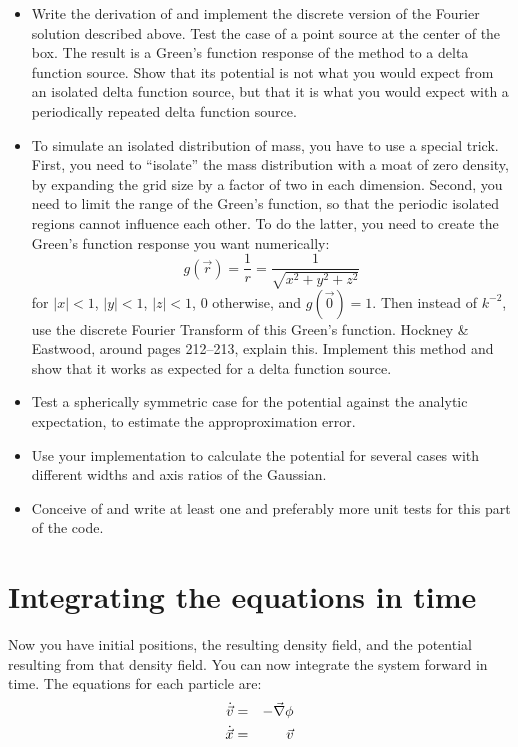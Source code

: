 \documentclass[11pt, preprint]{aastex}
\begin{document}
\begin{itemize}
\item Write the derivation of and implement the discrete version of
  the Fourier solution described above. Test the case of a point
  source at the center of the box. The result is a Green's function
  response of the method to a delta function source. Show that its
  potential is not what you would expect from an isolated delta
  function source, but that it is what you would expect with a
  periodically repeated delta function source.
\item To simulate an isolated distribution of mass, you have to use a
  special trick. First, you need to ``isolate'' the mass distribution
  with a moat of zero density, by expanding the grid size by a factor
  of two in each dimension. Second, you need to limit the range of the
  Green's function, so that the periodic isolated regions cannot
  influence each other. To do the latter, you need to create the
  Green's function response you want numerically:
  \begin{equation}
    g(\vec{r}) = \frac{1}{r} = \frac{1}{\sqrt{x^2 +y^2 + z^2}}
  \end{equation}
  for $|x|<1$, $|y|<1$, $|z|<1$, 0 otherwise, and $g(\vec{0}) =
  1$. Then instead of $k^{-2}$, use the discrete Fourier Transform of
  this Green's function.  Hockney \& Eastwood, around pages 212--213,
  explain this. Implement this method and show that it works as
  expected for a delta function source.
\item Test a spherically symmetric case for the potential against the
  analytic expectation, to estimate the approproximation error.
\item Use your implementation to calculate the potential for several
  cases with different widths and axis ratios of the Gaussian.
\item Conceive of and write at least one and preferably more unit
  tests for this part of the code. 
\end{itemize}

\section{Integrating the equations in time}

Now you have initial positions, the resulting density field, and the
potential resulting from that density field. You can now integrate the
system forward in time. The equations for each particle are:
\begin{eqnarray}
\dot{\vec{v}} &=& -\vec{\nabla}\phi \cr
\dot{\vec{x}} &=& \vec{v} 
\end{eqnarray}
\end{document}
